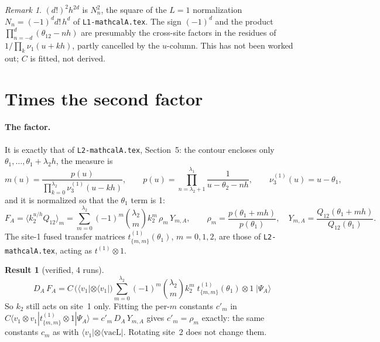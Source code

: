 \documentclass[11pt]{article}
\newcommand{\vacL}{\langle\mathrm{vacL}|}
\newcommand{\nb}[1]{\texttt{#1}}
\theoremstyle{definition}
\newtheorem{result}{Result}
\theoremstyle{remark}
\newtheorem*{remark}{Remark}
\begin{document}
\begin{remark}
$(d!)^2h^{2d}$ is $N_n^2$, the square of the $L=1$ normalization $N_n=(-1)^dd!\,h^d$ of \nb{L1-mathcalA.tex}. The sign $(-1)^d$ and the product $\prod_{n=-d}^{d}(\theta_{12}-nh)$ are presumably the cross-site factors in the residues of $1/\prod_k\nu_1(u+kh)$, partly cancelled by the $u$-column. This has not been worked out; $C$ is fitted, not derived.
\end{remark}

\section{Times the second factor}\label{sec:second}

\paragraph{The factor.}
It is exactly that of \nb{L2-mathcalA.tex}, Section~5: the contour encloses only $\theta_1,\dots,\theta_1+\lambda_2h$, the measure is
\begin{equation}
m(u)=\frac{p(u)}{\prod_{k=0}^{\lambda_2}\nu^{(1)}_3(u-kh)},\qquad p(u)=\prod_{n=\lambda_2+1}^{\lambda_1}\frac1{u-\theta_2-nh},\qquad \nu^{(1)}_3(u)=u-\theta_1,
\end{equation}
and it is normalized so that the $\theta_1$ term is 1:
\begin{equation}
F_A=\langle k_2^{u/h}Q_{12}\rangle_m=\sum_{m=0}^{\lambda_2}(-1)^m\binom{\lambda_2}{m}k_2^m\,\rho_m\,Y_{m,A},\qquad \rho_m=\frac{p(\theta_1+mh)}{p(\theta_1)},\quad Y_{m,A}=\frac{Q_{12}(\theta_1+mh)}{Q_{12}(\theta_1)} .
\end{equation}
The site-1 fused transfer matrices $t^{(1)}_{\{m,m\}}(\theta_1)$, $m=0,1,2$, are those of \nb{L2-mathcalA.tex}, acting as $t^{(1)}\otimes1$.

\begin{result}[verified, 4 runs]\label{res:second}
\begin{equation}
\boxed{\;D_A\,F_A=C\,\big(\langle v_1|\otimes\langle v_1|\big)\sum_{m=0}^{\lambda_2}(-1)^m\binom{\lambda_2}{m}k_2^m\;t^{(1)}_{\{m,m\}}(\theta_1)\otimes1\;|\Psi_A\rangle\;}
\end{equation}
So $k_2$ still acts on site~1 only. Fitting the per-$m$ constants $c'_m$ in $C\langle v_1\otimes v_1|t^{(1)}_{\{m,m\}}\otimes1|\Psi_A\rangle=c'_m\,D_A\,Y_{m,A}$ gives $c'_m=\rho_m$ exactly: the same constants $c_m$ as with $\langle v_1|\otimes\vacL$. Rotating site~2 does not change them.
\end{result}
\end{document}
